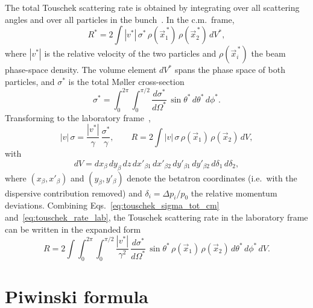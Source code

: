 The total Touschek scattering rate is obtained by integrating over all scattering
angles and over all particles in the bunch~\cite{PRSTAB:Xiao:TouschekMonteCarlo}.
In the c.m.\ frame,
\begin{equation}
    R^{*} = 2 \int |v^{*}|\, \sigma^{*}\, \rho(\vec{x}_{1}^{\,*})\, \rho(\vec{x}_{2}^{\,*})\, dV^{*} ,
    \label{eq:touschek_rate_cm}
\end{equation}
where $|v^*|$ is the relative velocity of the two particles and
$\rho(\vec{x}_i^{\,*})$ the beam phase-space density. The volume
element $dV^*$ spans the phase space of both particles, and $\sigma^*$ is the
total M\o ller cross-section
\begin{equation}
    \sigma^{*} = \int_{0}^{2\pi}\!\!\int_{0}^{\pi/2}
    \frac{d\sigma^{*}}{d\Omega^{*}}\, \sin\theta^{*}\, d\theta^{*}\, d\phi^{*} .
    \label{eq:touschek_sigma_tot_cm}
\end{equation}
Transforming to the laboratory frame~\cite{PRSTAB:Xiao:TouschekMonteCarlo},
\begin{equation}
    |v|\,\sigma = \frac{|v^{*}|}{\gamma}\,\frac{\sigma^{*}}{\gamma} ,
    \qquad
    R = 2 \int |v|\, \sigma\, \rho(\vec{x}_{1})\, \rho(\vec{x}_{2})\, dV ,
    \label{eq:touschek_rate_lab}
\end{equation}
with
\begin{equation*}
    dV = dx_{\beta}\, dy_{\beta}\, dz\, dx'_{\beta 1}\, dx'_{\beta 2}\,
         dy'_{\beta 1}\, dy'_{\beta 2}\, d\delta_{1}\, d\delta_{2} ,
\end{equation*}
where $(x_\beta, x'_\beta)$ and $(y_\beta, y'_\beta)$ denote the betatron
coordinates (i.e.\ with the dispersive contribution removed) and
$\delta_i = \Delta p_i / p_0$ the relative momentum deviations. Combining
Eqs.~\eqref{eq:touschek_sigma_tot_cm} and~\eqref{eq:touschek_rate_lab}, the
Touschek scattering rate in the laboratory frame can be written in the expanded
form
\begin{equation}
    R = 2 \int\!\!\int_{0}^{2\pi}\!\!\int_{0}^{\pi/2}
    \frac{|v^{*}|}{\gamma^{2}}
    \, \frac{d\sigma^{*}}{d\Omega^{*}}
    \, \sin\theta^{*}\,
    \rho(\vec{x}_{1})\, \rho(\vec{x}_{2})
    \, d\theta^{*}\, d\phi^{*}\, dV .
    \label{eq:touschek_rate_expanded}
\end{equation}

\section{Piwinski formula}
\label{section:touschek_piwinski}

